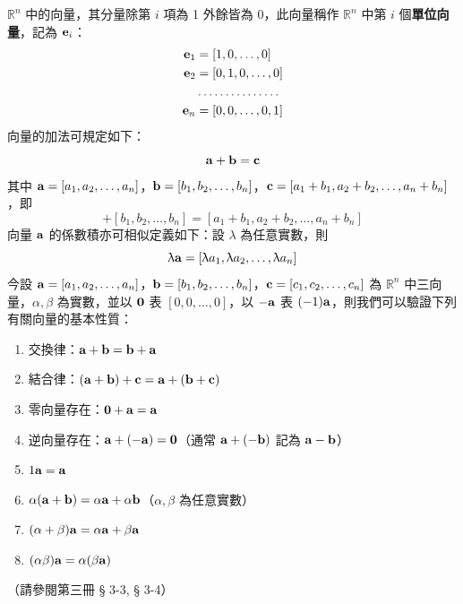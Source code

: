 $\mathbb{R}^n$ 中的向量，其分量除第 $i$ 項為 1 外餘皆為 0，此向量稱作 $\mathbb{R}^n$ 中第 $i$ 個\textbf{單位向量}，記為 $\boldsymbol{\mathbf{e}}_i$：
\begin{equation}
\begin{aligned}
\boldsymbol{\mathbf{e}}_1 &= [1, 0, \dots, 0] \\
\boldsymbol{\mathbf{e}}_2 &= [0, 1, 0, \dots, 0] \\
&\dots\dots\dots\dots\dots \\
\boldsymbol{\mathbf{e}}_n &= [0, 0, \dots, 0, 1]
\end{aligned} \label{eq:b6s-1-1-3}
\end{equation}
向量的加法可規定如下：
\[ \boldsymbol{\mathbf{a}} + \boldsymbol{\mathbf{b}} = \boldsymbol{\mathbf{c}} \]
其中 $\boldsymbol{\mathbf{a}}=[a_1, a_2, \dots, a_n]$，$\boldsymbol{\mathbf{b}}=[b_1, b_2, \dots, b_n]$，$\boldsymbol{\mathbf{c}}=[a_1+b_1, a_2+b_2, \dots, a_n+b_n]$，即
\begin{equation}
[a_1, a_2, \dots, a_n] + [b_1, b_2, \dots, b_n] = [a_1+b_1, a_2+b_2, \dots, a_n+b_n] \label{eq:b6s-1-1-4}
\end{equation}
向量 $\boldsymbol{\mathbf{a}}$ 的係數積亦可相似定義如下：設 $\lambda$ 為任意實數，則
\begin{equation}
\uplambda \boldsymbol{\mathbf{a}} = [\uplambda a_1, \uplambda a_2, \dots, \uplambda a_n] \label{eq:b6s-1-1-5}
\end{equation}
今設 $\boldsymbol{\mathbf{a}}=[a_1, a_2, \dots, a_n]$，$\boldsymbol{\mathbf{b}}=[b_1, b_2, \dots, b_n]$，$\boldsymbol{\mathbf{c}}=[c_1, c_2, \dots, c_n]$ 為 $\mathbb{R}^n$ 中三向量，$\alpha, \beta$ 為實數，並以 $\boldsymbol{\mathbf{0}}$ 表 $[0, 0, \dots, 0]$，以 $-\boldsymbol{\mathbf{a}}$ 表 $(-1)\boldsymbol{\mathbf{a}}$，則我們可以驗證下列有關向量的基本性質：
\begin{enumerate}[label=\Roman*., leftmargin=2.5em]
  \item 交換律：$\boldsymbol{\mathbf{a}}+\boldsymbol{\mathbf{b}} = \boldsymbol{\mathbf{b}}+\boldsymbol{\mathbf{a}}$
  \item 結合律：$(\boldsymbol{\mathbf{a}}+\boldsymbol{\mathbf{b}})+\boldsymbol{\mathbf{c}} = \boldsymbol{\mathbf{a}}+(\boldsymbol{\mathbf{b}}+\boldsymbol{\mathbf{c}})$
  \item 零向量存在：$\boldsymbol{\mathbf{0}}+\boldsymbol{\mathbf{a}} = \boldsymbol{\mathbf{a}}$
  \item 逆向量存在：$\boldsymbol{\mathbf{a}}+(-\boldsymbol{\mathbf{a}}) = \boldsymbol{\mathbf{0}}$（通常 $\boldsymbol{\mathbf{a}}+(-\boldsymbol{\mathbf{b}})$ 記為 $\boldsymbol{\mathbf{a}}-\boldsymbol{\mathbf{b}}$）
  \item $1\boldsymbol{\mathbf{a}} = \boldsymbol{\mathbf{a}}$
  \item $\alpha(\boldsymbol{\mathbf{a}}+\boldsymbol{\mathbf{b}}) = \alpha\boldsymbol{\mathbf{a}} + \alpha\boldsymbol{\mathbf{b}}$（$\alpha, \beta$ 為任意實數）
  \item $(\alpha+\beta)\boldsymbol{\mathbf{a}} = \alpha\boldsymbol{\mathbf{a}} + \beta\boldsymbol{\mathbf{a}}$
  \item $(\alpha\beta)\boldsymbol{\mathbf{a}} = \alpha(\beta\boldsymbol{\mathbf{a}})$
\end{enumerate}
（請參閱第三冊 § 3-3, § 3-4）

